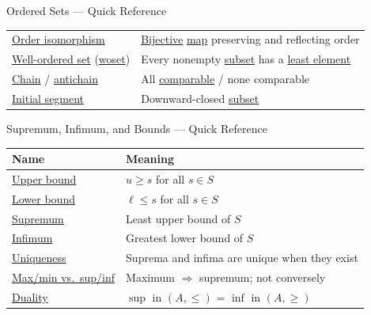 \begin{toolkitbox}{Ordered Sets --- Quick Reference}
\begin{tabular}{l l}
\hyperref[def:order-isomorphism-ordered-sets]{Order isomorphism}   & \hyperref[def:bijective]{Bijective} \hyperref[def:function]{map} preserving and reflecting order \\
\hyperref[def:well-ordered-set]{Well-ordered set}
(\hyperref[def:woset]{woset})    & Every nonempty \hyperref[def:subset]{subset} has a \hyperref[def:order-least-element]{least element}                   \\
\hyperref[def:order-chain]{Chain} / \hyperref[def:order-antichain]{antichain}   & All \hyperref[def:comparable]{comparable} / none comparable                            \\
\hyperref[def:initial-segment]{Initial segment}     & Downward-closed \hyperref[def:subset]{subset}                                      \\
\bottomrule
\end{tabular}
\end{toolkitbox}



\begin{toolkitbox}{Supremum, Infimum, and Bounds --- Quick Reference}
\small
\begin{tabular}{l l}
\toprule
\textbf{Name}  & \textbf{Meaning} \\
\midrule
\hyperref[def:upper-bound]{Upper bound}        & $u \geq s$ for all $s \in S$                       \\
\hyperref[def:lower-bound]{Lower bound}        & $\ell \leq s$ for all $s \in S$                    \\
\hyperref[def:sup-inf]{Supremum}           & Least upper bound of $S$                           \\
\hyperref[def:sup-inf]{Infimum}            & Greatest lower bound of $S$                        \\
\hyperref[prop:sup-unique]{Uniqueness}         & Suprema and infima are unique when they exist       \\
\hyperref[def:sup-inf]{Max/min vs.\ sup/inf}  & Maximum $\Rightarrow$ supremum; not conversely \\
\hyperref[prop:sup-inf-duality]{Duality}            & $\sup$ in $(A,\leq)$ = $\inf$ in $(A,\geq)$        \\
\bottomrule
\end{tabular}
\end{toolkitbox}



